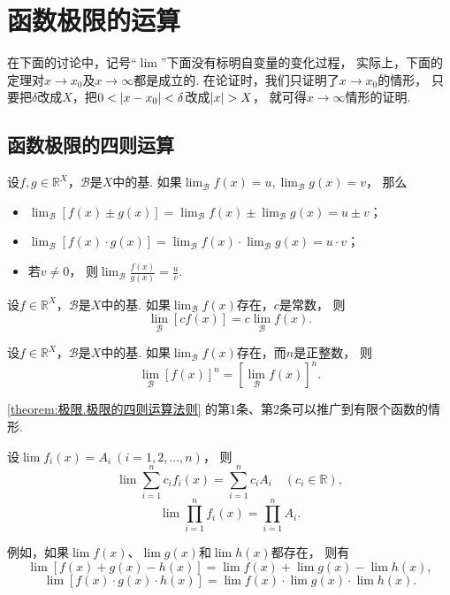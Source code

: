 \section{函数极限的运算}
在下面的讨论中，记号“\(\lim\)”下面没有标明自变量的变化过程，
实际上，下面的定理对\(x \to x_0\)及\(x \to \infty\)都是成立的.
在论证时，我们只证明了\(x \to x_0\)的情形，
只要把\(\delta\)改成\(X\)，把\(0<\abs{x-x_0}<\delta\)改成\(\abs{x}>X\)，
就可得\(x\to\infty\)情形的证明.

\subsection{函数极限的四则运算}
\begin{theorem}\label{theorem:极限.极限的四则运算法则}
设\(f,g\in\mathbb{R}^X\)，\(\mathcal{B}\)是\(X\)中的基.
如果\(\lim_\mathcal{B} f(x) = u,
\lim_\mathcal{B} g(x) = v\)，
那么\begin{itemize}
	\item \(\lim_\mathcal{B} [f(x) \pm g(x)]
	= \lim_\mathcal{B} f(x) \pm \lim_\mathcal{B} g(x)
	= u \pm v\)；

	\item \(\lim_\mathcal{B} [f(x) \cdot g(x)]
	= \lim_\mathcal{B} f(x) \cdot \lim_\mathcal{B} g(x)
	= u \cdot v\)；

	\item 若\(v\neq0\)，
	则\(\lim_\mathcal{B} \frac{f(x)}{g(x)} = \frac{u}{v}\).
\end{itemize}
\end{theorem}

\begin{corollary}
设\(f\in\mathbb{R}^X\)，\(\mathcal{B}\)是\(X\)中的基.
如果\(\lim_\mathcal{B} f(x)\)存在，\(c\)是常数，
则\[
	\lim_\mathcal{B} [c f(x)] = c \lim_\mathcal{B} f(x).
\]
\end{corollary}

\begin{corollary}
设\(f\in\mathbb{R}^X\)，\(\mathcal{B}\)是\(X\)中的基.
如果\(\lim_\mathcal{B} f(x)\)存在，而\(n\)是正整数，
则\[\lim_\mathcal{B} [f(x)]^n = [\lim_\mathcal{B} f(x)]^n.\]
\end{corollary}

\cref{theorem:极限.极限的四则运算法则} 的第1条、第2条可以推广到有限个函数的情形.
\begin{corollary}
设\(\lim f_i(x) = A_i\ (i=1,2,\dotsc,n)\)，
则\[
	\lim \sum_{i=1}^n c_i f_i(x) = \sum_{i=1}^n c_i A_i
	\quad(c_i\in\mathbb{R}),
\]\[
	\lim \prod_{i=1}^n f_i(x) = \prod_{i=1}^n A_i.
\]
\end{corollary}
例如，如果\(\lim f(x)\)、\(\lim g(x)\)和\(\lim h(x)\)都存在，
则有\[
	\lim[f(x) + g(x) - h(x)] = \lim f(x) + \lim g(x) - \lim h(x),
\]\[
	\lim[f(x) \cdot g(x) \cdot h(x)] = \lim f(x) \cdot \lim g(x) \cdot \lim h(x).
\]

